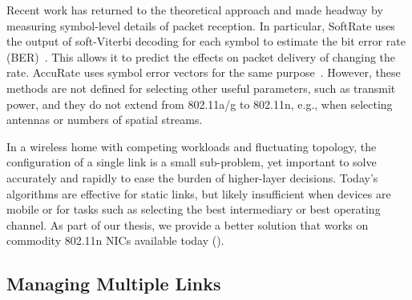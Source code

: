 
Recent work has returned to the theoretical approach and made headway by measuring symbol-level details of packet reception. In particular, SoftRate uses the output of soft-Viterbi decoding for each symbol to estimate the bit error rate (BER)~\cite{Vutukuru_SoftRate}. This allows it to predict the effects on packet delivery of changing the rate. AccuRate uses symbol error vectors for the same purpose~\cite{accurate_nsdi10}.  However, these methods are not defined for selecting other useful parameters, such as transmit power, and they do not extend from 802.11a/g to 802.11n, e.g., when selecting antennas or numbers of spatial streams.

In a wireless home with competing workloads and fluctuating topology, the configuration of a single link is a small sub-problem, yet important to solve accurately and rapidly to ease the burden of higher-layer decisions. Today's algorithms are effective for static links, but likely insufficient when devices are mobile or for tasks such as selecting the best intermediary or best operating channel. As part of our thesis, we provide a better solution that works on commodity 802.11n NICs available today ().

\subsection{Managing Multiple Links}


